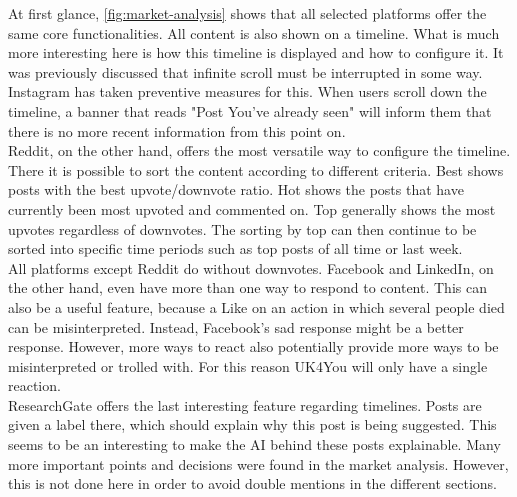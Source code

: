 At first glance, \autoref{fig:market-analysis} shows that all selected platforms offer the same core functionalities.
All content is also shown on a timeline.
What is much more interesting here is how this timeline is displayed and how to configure it.
It was previously discussed that infinite scroll must be interrupted in some way.
Instagram has taken preventive measures for this.
When users scroll down the timeline, a banner that reads "Post You've already seen" will inform them that there is no more recent information from this point on.\\

Reddit, on the other hand, offers the most versatile way to configure the timeline.
There it is possible to sort the content according to different criteria.
Best shows posts with the best upvote/downvote ratio. Hot shows the posts that have currently been most upvoted and commented on.
Top generally shows the most upvotes regardless of downvotes.
The sorting by top can then continue to be sorted into specific time periods such as top posts of all time or last week.\\

All platforms except Reddit do without downvotes. Facebook and LinkedIn, on the other hand, even have more than one way to respond to content.
This can also be a useful feature, because a Like on an action in which several people died can be misinterpreted.
Instead, Facebook's sad response might be a better response.
However, more ways to react also potentially provide more ways to be misinterpreted or trolled with.
For this reason UK4You will only have a single reaction.\\

ResearchGate offers the last interesting feature regarding timelines.
Posts are given a label there, which should explain why this post is being suggested.
This seems to be an interesting to make the AI behind these posts explainable.
Many more important points and decisions were found in the market analysis.
However, this is not done here in order to avoid double mentions in the different sections.\\
